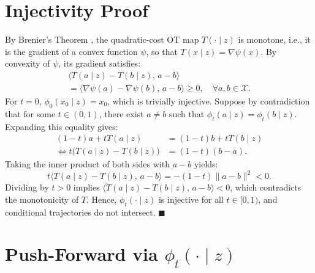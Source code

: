 \appendix
\providecommand{\todo}[1]{\textcolor{red}{[TODO: #1]}}

\section{Injectivity Proof}
\label{injectivity}

By Brenier's Theorem \cite{brenier1991polar}, the quadratic-cost OT map $T(\cdot \mid z)$ is monotone, i.e., it is the gradient of a convex function $\psi$, so that $T(x \mid z) = \nabla \psi(x)$. By convexity of $\psi$, its gradient satisfies:
\begin{multline}
    \langle T(a \mid z) - T(b \mid z), \, a - b \rangle \\
        = \langle \nabla \psi(a) - \nabla \psi(b), \, a - b \rangle \ge 0, \quad \forall a, b \in \mathcal{X}.
\end{multline}
For $t = 0$, $\phi_0(x_0 \mid z) = x_0$, which is trivially injective. Suppose by contradiction that for some $t \in (0, 1)$, there exist $a \neq b$ such that $\phi_t(a \mid z) = \phi_t(b \mid z)$. Expanding this equality gives:
\begin{align}
    (1 - t)a + t T(a \mid z) &= (1 - t)b + t T(b \mid z) \nonumber \\
    \iff t \big(T(a \mid z) - T(b \mid z)\big) &= (1 - t)(b - a).
\end{align}
Taking the inner product of both sides with $a - b$ yields:
\begin{equation}
    t \langle T(a \mid z) - T(b \mid z), \, a - b \rangle = -(1 - t) \|a - b\|^2 < 0.
\end{equation}
Dividing by $t > 0$ implies $\langle T(a \mid z) - T(b \mid z), \, a - b \rangle < 0$, which contradicts the monotonicity of $T$. Hence, $\phi_t(\cdot \mid z)$ is injective for all $t \in [0, 1)$, and conditional trajectories do not intersect.
\hfill $\blacksquare$


\section{Push-Forward via \texorpdfstring{$\phi_t(\cdot \mid z)$}{phi\_t}}
\label{push_forward}

